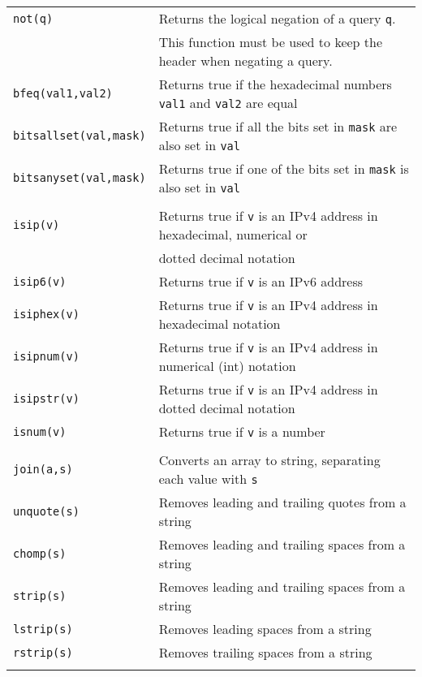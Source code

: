 \documentclass[documentation]{subfiles}
\begin{document}
\begin{longtable}{ll}
    {\tt not(q)}               & Returns the logical negation of a query {\tt q}.\\
                               & This function must be used to keep the header when negating a query.\\
    {\tt bfeq(val1,val2)}      & Returns true if the hexadecimal numbers {\tt val1} and {\tt val2} are equal\\
    {\tt bitsallset(val,mask)} & Returns true if all the bits set in {\tt mask} are also set in {\tt val}\\
    {\tt bitsanyset(val,mask)} & Returns true if one of the bits set in {\tt mask} is also set in {\tt val}\\\\

    {\tt isip(v)}     & Returns true if {\tt v} is an IPv4 address in hexadecimal, numerical or\\
                      & dotted decimal notation\\
    {\tt isip6(v)}    & Returns true if {\tt v} is an IPv6 address\\
    {\tt isiphex(v)}  & Returns true if {\tt v} is an IPv4 address in hexadecimal notation\\
    {\tt isipnum(v)}  & Returns true if {\tt v} is an IPv4 address in numerical (int) notation\\
    {\tt isipstr(v)}  & Returns true if {\tt v} is an IPv4 address in dotted decimal notation\\
    {\tt isnum(v)}    & Returns true if {\tt v} is a number\\\\

    {\tt join(a,s)}   & Converts an array to string, separating each value with {\tt s}\\
    {\tt unquote(s)}  & Removes leading and trailing quotes from a string\\
    {\tt chomp(s)}    & Removes leading and trailing spaces from a string\\
    {\tt strip(s)}    & Removes leading and trailing spaces from a string\\
    {\tt lstrip(s)}   & Removes leading spaces from a string\\
    {\tt rstrip(s)}   & Removes trailing spaces from a string\\\\


\end{longtable}
\end{document}
